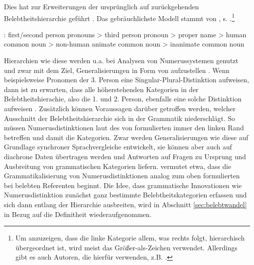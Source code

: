 Dies hat zur Erweiterungen der ursprünglich auf \textcite{Silverstein1976} zurückgehenden Belebtheitshierarchie geführt \parencite[vgl. u.a.][]{Allan1987,Langacker1991,Langacker2008,Dixon1995,Corbett2000,Foley2007}. Das gebräuchlichste Modell stammt von \textcite[85]{Dixon1995}, s.  \parencite[vgl.][130]{Croft2006}.\footnote{Um anzuzeigen, dass die linke Kategorie allem, was rechts folgt, hierarchisch übergeordnet ist, wird meist das Größer-als-Zeichen \hervor{>} verwendet. Allerdings gibt es auch Autoren, die hierfür \hervor{<} verwenden, z.B. \textcite{Allan1987,Croft2006}.}  

\begin{exe}
	\ex \label{ex:dixon} : first/second person pronouns > third person pronoun > proper name > human common noun > non-human animate common noun > inanimate common noun
	\end{exe}
\noindent
Hierarchien wie diese werden u.a. bei Analysen von Numerussystemen genutzt \parencite{Corbett2000,Croft2006} und zwar mit dem Ziel, Generalisierungen in Form von  \parencite[2]{Zifonun2006} aufzustellen \parencite[vgl. auch][47]{Dahl1996}. Wenn beispielsweise Pronomen der 3. Person eine Singular-Plural-Distinktion aufweisen, dann ist zu erwarten, dass alle höherstehenden Kategorien in der Belebtheitshierachie, also die 1. und 2. Person, ebenfalls eine solche Distinktion aufweisen \parencite[129]{Croft2006}. Zusätzlich können Voraussagen darüber getroffen werden, welcher Ausschnitt der Belebtheitshierarchie sich in der Grammatik niederschlägt. So müssen Numerusdistinktionen laut des von \textcite[56]{Corbett2000} formulierten  immer den linken Rand betreffen und damit die  Kategorien. Zwar werden Generalisierungen wie diese auf Grundlage synchroner Sprachvergleiche entwickelt, sie können aber auch auf diachrone Daten übertragen werden und Antworten auf Fragen zu Ursprung und Ausbreitung von grammatischen Kategorien liefern. \textcite[265ff.]{Corbett2000} vermutet etwa, dass die Grammatikalisierung von Numerusdistinktionen analog zum oben formulierten  bei belebten Referenten beginnt. Die Idee, dass grammatische Innovationen wie Numerusdistinktion zunächst ganz bestimmte Belebtheitskategorien erfassen und sich dann entlang der Hierarchie ausbreiten, wird in Abschnitt \ref{sec:belebtwandel} in Bezug auf die Definitheit wiederaufgenommen. 

